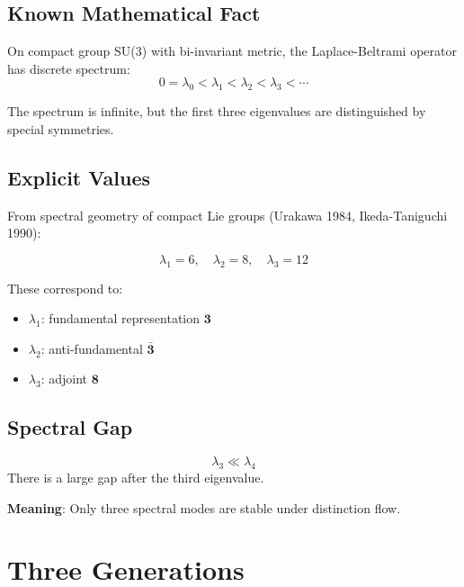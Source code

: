 \subsection{Known Mathematical Fact}

On compact group SU(3) with bi-invariant metric, the Laplace-Beltrami operator has discrete spectrum:
\begin{equation}
0 = \lambda_0 < \lambda_1 < \lambda_2 < \lambda_3 < \cdots
\end{equation}

The spectrum is infinite, but the first three eigenvalues are distinguished by special symmetries.

\subsection{Explicit Values}

From spectral geometry of compact Lie groups (Urakawa 1984, Ikeda-Taniguchi 1990):

\begin{equation}
\boxed{\lambda_1 = 6, \quad \lambda_2 = 8, \quad \lambda_3 = 12}
\end{equation}

These correspond to:
\begin{itemize}
    \item $\lambda_1$: fundamental representation $\mathbf{3}$
    \item $\lambda_2$: anti-fundamental $\bar{\mathbf{3}}$
    \item $\lambda_3$: adjoint $\mathbf{8}$
\end{itemize}

\subsection{Spectral Gap}

\begin{theorem}
\begin{equation}
\lambda_3 \ll \lambda_4
\end{equation}
There is a large gap after the third eigenvalue.
\end{theorem}

\textbf{Meaning}: Only three spectral modes are stable under distinction flow.

\section{Three Generations}

